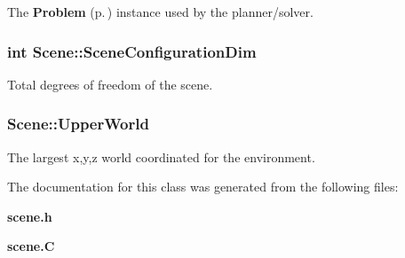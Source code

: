 The {\bf Problem} {\rm (p.\,\pageref{classProblem})} instance used by the planner/solver.

\subsubsection{\setlength{\rightskip}{0pt plus 5cm}int Scene::Scene\-Configuration\-Dim}\label{classScene_m3}


Total degrees of freedom of the scene.

\subsubsection{ Scene::Upper\-World}\label{classScene_m5}


The largest x,y,z world coordinated for the environment.



The documentation for this class was generated from the following files:\begin{CompactItemize}
\item 
{\bf scene.h}\item 
{\bf scene.C}\end{CompactItemize}

